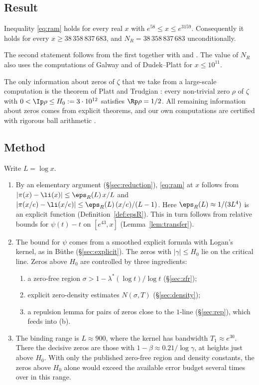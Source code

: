 \subsection*{Result}
\begin{theorem}\label{thm:main}
Inequality \eqref{eq:ram} holds for every real $x$ with $e^{58} \le x \le e^{3159}$.
Consequently it holds for every $x \ge 38\,358\,837\,683$, and $N_R = 38\,358\,837\,683$ unconditionally.
\end{theorem}

The second statement follows from the first together with \cite[Thm.~5.1]{Johnston} and \cite[Thm.~1.1]{Axler}.
The value of $N_R$ also uses the computations of Galway and of Dudek--Platt \cite{DudekPlatt} for $x \le 10^{11}$.

The only information about zeros of $\zeta$ that we take from a large-scale computation is the theorem of Platt and Trudgian \cite{PlattTrudgianRH}:
every non-trivial zero $\rho$ of $\zeta$ with $0 < \Ip\rho \le H_0 := 3\cdot 10^{12}$ satisfies $\Rp \rho = 1/2$.
All remaining information about zeros comes from explicit theorems, and our own computations are certified with rigorous ball arithmetic \cite{arb}.

\subsection*{Method}
Write $L = \log x$.
\begin{enumerate}
\item By an elementary argument (\S\ref{sec:reduction}), \eqref{eq:ram} at $x$ follows from
  $|\pi(x)-\li(x)| \le \eps_R(L)\,x/L$ and $|\pi(x/e)-\li(x/e)| \le \eps_R(L)\,(x/e)/(L-1)$.
  Here $\eps_R(L) \approx 1/(3L^4)$ is an explicit function (Definition~\ref{def:epsR}).
  This in turn follows from relative bounds for $\psi(t)-t$ on $[e^{43}, x]$ (Lemma~\ref{lem:transfer}).
\item The bound for $\psi$ comes from a smoothed explicit formula with Logan's kernel, as in B\"uthe \cite{Buthe2016,Buthe2018} (\S\ref{sec:explicit}).
  The zeros with $|\gamma| \le H_0$ lie on the critical line.
  Zeros above $H_0$ are controlled by three ingredients:
  \begin{enumerate}
  \item[(a)] a zero-free region $\sigma > 1 - \lambda^*(\log t)/\log t$ (\S\ref{sec:zfr});
  \item[(b)] explicit zero-density estimates $N(\sigma,T)$ (\S\ref{sec:density});
  \item[(c)] a repulsion lemma for pairs of zeros close to the $1$-line (\S\ref{sec:rep}), which feeds into (b).
  \end{enumerate}
\item The binding range is $L \approx 900$, where the kernel has bandwidth $T_1 \approx e^{30}$.
  There the decisive zeros are those with $1-\beta \approx 0.21/\log\gamma$, at heights just above $H_0$.
  With only the published zero-free region and density constants, the zeros above $H_0$ alone would exceed the available error budget several times over in this range.
\end{enumerate}

